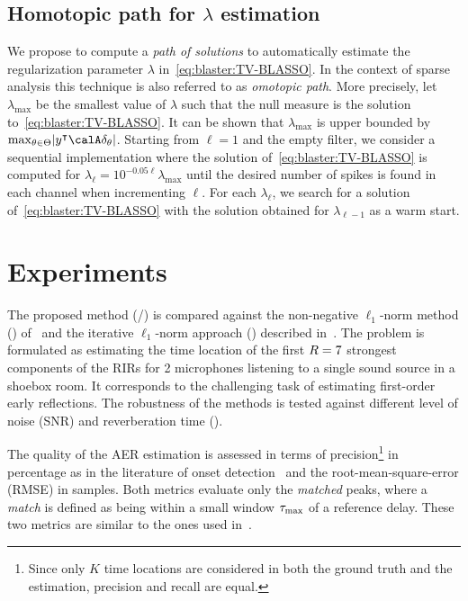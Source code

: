 \subsection{Homotopic path for $\lambda$ estimation}\label{sec:blaster:lambda}
We propose to compute a \textit{path of solutions} to automatically estimate the regularization parameter $\lambda$  in~\cref{eq:blaster:TV-BLASSO}.
In the context of sparse analysis this technique is also referred to as \textit{omotopic path}.
More precisely, let $\lambda_{\max}$ be the smallest value of $\lambda$ such that the null measure is the solution to~\cref{eq:blaster:TV-BLASSO}.
It can be shown that $\lambda_{\max}$ is upper bounded by $\max_{\theta\in\Theta} \kvbar{y^\intercal\opObs\delta_\theta}$.
Starting from $\ell=1$ and the empty filter, we consider a sequential implementation where the solution of~\cref{eq:blaster:TV-BLASSO} is computed for $\lambda_\ell= 10^{-0.05\ell}\lambda_{\max}$ until the desired number of spikes is found in each channel when incrementing $\ell$.
For each $\lambda_\ell$, we search for a solution of~\cref{eq:blaster:TV-BLASSO} with the solution obtained for $\lambda_{\ell-1}$ as a warm start.

\section{Experiments}
\label{sec:blaster:exp}
The proposed method (\BLASTER/) is compared against the non-negative $\ell_1$-norm method (\algoBsn) of~ and the iterative $\ell_1$-norm approach (\algoCrocco) described in~.
The problem is formulated as estimating the time location of the first $R=7$ strongest components of the RIRs for 2 microphones listening to a single sound source in a shoebox room. It corresponds to the challenging task of estimating first-order early reflections.
The robustness of the methods is tested against different level of noise (SNR) and reverberation time (\RT{}).

The quality of the AER estimation is assessed in terms of precision\footnote{Since only $K$ time locations are considered in both the ground truth and the estimation, precision and recall are equal.} in percentage as in the literature of onset detection~ and the root-mean-square-error (RMSE) in samples.
Both metrics evaluate only the \textit{matched} peaks, where a \textit{match} is defined as being within a small window $\tau_\text{max}$ of a reference delay. These two metrics are similar to the ones used in~.

